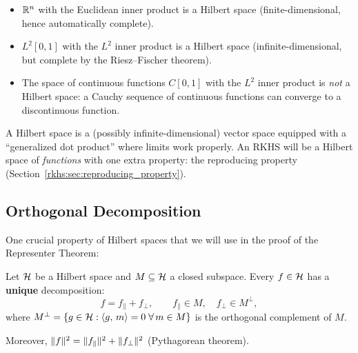 \begin{notechapter}
\begin{examplebox}
\begin{itemize}
  \item $\mathbb{R}^n$ with the Euclidean inner product is a Hilbert space
  (finite-dimensional, hence automatically complete).
  \item $L^2[0,1]$ with the $L^2$ inner product is a Hilbert space
  (infinite-dimensional, but complete by the Riesz--Fischer theorem).
  \item The space of continuous functions $C[0,1]$ with the $L^2$ inner
  product is \emph{not} a Hilbert space: a Cauchy sequence of continuous
  functions can converge to a discontinuous function.
\end{itemize}
\end{examplebox}

\begin{insightbox}
A Hilbert space is a (possibly infinite-dimensional) vector space
equipped with a ``generalized dot product'' where limits work properly.
An RKHS will be a Hilbert space of \emph{functions} with one extra
property: the reproducing property
(Section~\ref{rkhs:sec:reproducing_property}).
\end{insightbox}

\subsection{Orthogonal Decomposition}
\label{rkhs:subsec:orthogonal}

One crucial property of Hilbert spaces that we will use in the proof of
the Representer Theorem:

\begin{theorembox}
\begin{theorem}
\label{rkhs:thm:ortho_decomp}
Let $\mathcal{H}$ be a Hilbert space and $M \subseteq \mathcal{H}$ a closed
subspace. Every $f \in \mathcal{H}$ has a \textbf{unique} decomposition:
\[
f = f_\parallel + f_\perp, \qquad f_\parallel \in M,\quad f_\perp \in M^\perp,
\]
where $M^\perp = \{g \in \mathcal{H} : \langle g,\, m \rangle = 0 \;\forall\, m \in M\}$
is the orthogonal complement of $M$.

Moreover, $\| f \|^2 = \| f_\parallel \|^2 + \| f_\perp \|^2$
(Pythagorean theorem).
\end{theorem}
\end{theorembox}

\begin{figure}[ht]
\centering
{}
\end{figure}
\end{notechapter}
